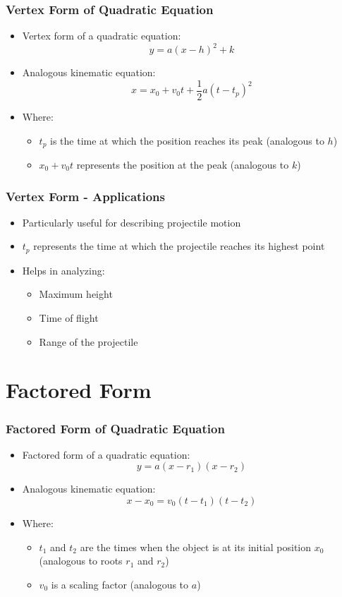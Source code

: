 \documentclass{beamer}
\begin{document}
\begin{frame}
\frametitle{Vertex Form of Quadratic Equation}
\begin{itemize}
    \item Vertex form of a quadratic equation:
    $$y = a(x - h)^2 + k$$
    \item Analogous kinematic equation:
    $$x = x_0 + v_0t + \frac{1}{2}a(t - t_p)^2$$
    \item Where:
    \begin{itemize}
        \item $t_p$ is the time at which the position reaches its peak (analogous to $h$)
        \item $x_0 + v_0t$ represents the position at the peak (analogous to $k$)
    \end{itemize}
\end{itemize}
\end{frame}

\begin{frame}
\frametitle{Vertex Form - Applications}
\begin{itemize}
    \item Particularly useful for describing projectile motion
    \item $t_p$ represents the time at which the projectile reaches its highest point
    \item Helps in analyzing:
    \begin{itemize}
        \item Maximum height
        \item Time of flight
        \item Range of the projectile
    \end{itemize}
\end{itemize}
\end{frame}

\section{Factored Form}

\begin{frame}
\frametitle{Factored Form of Quadratic Equation}
\begin{itemize}
    \item Factored form of a quadratic equation:
    $$y = a(x - r_1)(x - r_2)$$
    \item Analogous kinematic equation:
    $$x - x_0 = v_0(t - t_1)(t - t_2)$$
    \item Where:
    \begin{itemize}
        \item $t_1$ and $t_2$ are the times when the object is at its initial position $x_0$ (analogous to roots $r_1$ and $r_2$)
        \item $v_0$ is a scaling factor (analogous to $a$)
    \end{itemize}
\end{itemize}
\end{frame}
\end{document}
